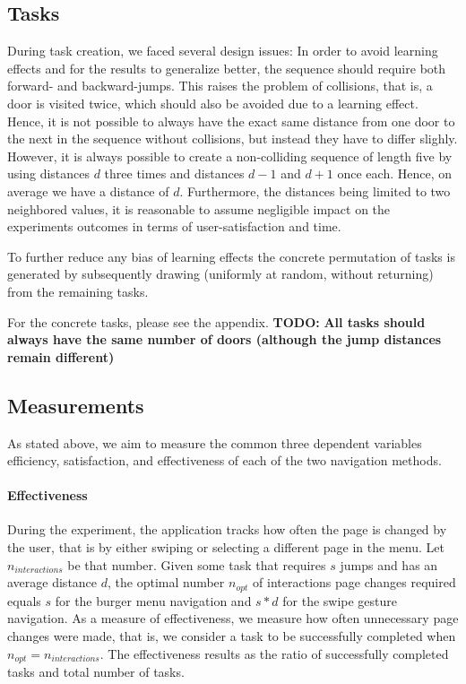 \documentclass{sig-alternate-05-2015}
\newcommand{\todo}{\textbf{TODO:} \textbf}
\begin{document}
\subsection{Tasks}
\label{sec:task}
During task creation, we faced several design issues: In order to avoid learning effects and for the results to generalize better, 
the sequence should require both forward- and backward-jumps. This raises the problem of collisions, that is, a door is visited twice, which
should also be avoided due to a learning effect. Hence, it is not possible to always have the exact same distance from one door to the
next in the sequence without collisions, but instead they have to differ slighly. However, it is always possible to create a non-colliding sequence of
length five by using distances $d$ three times and distances $d - 1$ and $d + 1$ once each. Hence, on average we have a distance of $d$. 
Furthermore, the distances being limited to two neighbored values, it is reasonable to assume negligible
impact on the experiments outcomes in terms of user-satisfaction and time.

To further reduce any bias of learning effects
the concrete permutation of tasks is generated by subsequently drawing
(uniformly at random, without returning) from the remaining tasks.

For the concrete tasks, please see the appendix. 
\todo{All tasks should always have the same number of doors (although the jump distances remain different)}
\subsection{Measurements}
\label{sec:measurements}
As stated above, we aim to measure the common three dependent variables efficiency, satisfaction, and effectiveness of each of the two navigation methods.
\paragraph{Effectiveness}
During the experiment, the application tracks how often the page is changed by the user, that is by either swiping or selecting a different page in the menu. 
Let $n_{interactions}$ be that number.
Given some task that requires $s$ jumps and has an average distance $d$, the optimal number $n_{opt}$ of interactions
page changes required equals $s$ for the burger menu navigation and $s * d$ for the swipe gesture navigation. As a measure of 
effectiveness, we measure how often unnecessary page changes were made, that is, we consider a task to be successfully completed 
when $n_{opt} = n_{interactions}$. The effectiveness results as the ratio of successfully completed tasks and total number of tasks.
\end{document}
